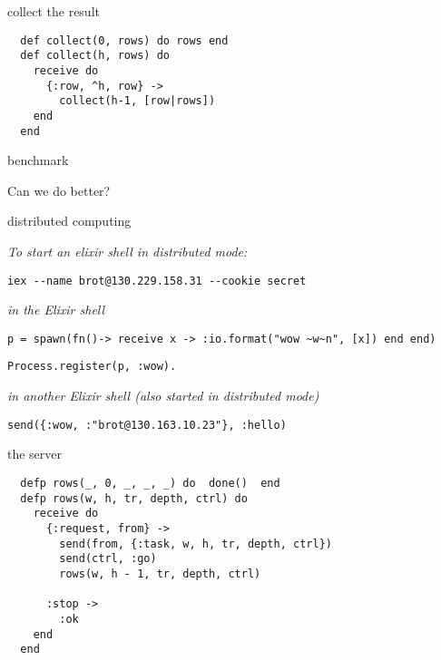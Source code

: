 \begin{frame}[fragile]{collect the result}

\begin{verbatim}
  def collect(0, rows) do rows end
  def collect(h, rows) do
    receive do
      {:row, ^h, row} ->
        collect(h-1, [row|rows])
    end
  end
\end{verbatim}
\end{frame}

\begin{frame}{benchmark}

Can we do better?

\end{frame}

\begin{frame}[fragile]{distributed computing}

{\em To start an elixir shell in distributed mode:}

\begin{verbatim}
iex --name brot@130.229.158.31 --cookie secret
\end{verbatim}
\pause\vspace{10pt}

\pause
{\em in the Elixir shell}

\begin{verbatim}
p = spawn(fn()-> receive x -> :io.format("wow ~w~n", [x]) end end)
\end{verbatim}
\pause
\begin{verbatim}
Process.register(p, :wow).
\end{verbatim}
\pause
\pause\vspace{10pt}

{\em in another Elixir shell (also started in distributed mode)}

\begin{verbatim}
send({:wow, :"brot@130.163.10.23"}, :hello)
\end{verbatim}


\end{frame}

\begin{frame}[fragile]{the server}

\begin{verbatim}
  defp rows(_, 0, _, _, _) do  done()  end
  defp rows(w, h, tr, depth, ctrl) do
    receive do
      {:request, from} ->
        send(from, {:task, w, h, tr, depth, ctrl})
        send(ctrl, :go)
        rows(w, h - 1, tr, depth, ctrl)

      :stop ->
        :ok
    end
  end
\end{verbatim}
\end{frame}

